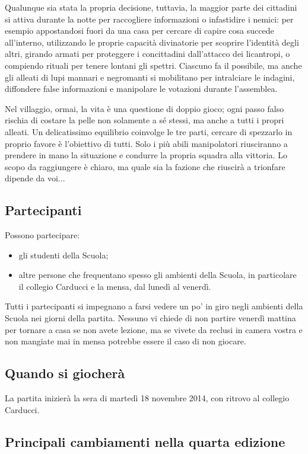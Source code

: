 \documentclass[a4paper,10pt]{article}
\begin{document}
Qualunque sia stata la propria decisione, tuttavia, la maggior parte dei
cittadini si attiva durante la notte per raccogliere informazioni o infastidire
i nemici: per esempio appostandosi fuori da una casa per cercare di capire cosa
succede all'interno, utilizzando le proprie capacità divinatorie per scoprire
l'identità degli altri, girando armati per proteggere i concittadini
dall'attacco dei licantropi, o compiendo rituali per tenere lontani gli spettri.
Ciascuno fa il possibile, ma anche gli alleati di lupi mannari e negromanti si
mobilitano per intralciare le indagini, diffondere false informazioni e
manipolare le votazioni durante l'assemblea.

Nel villaggio, ormai, la vita è una questione di doppio gioco; ogni passo falso
rischia di costare la pelle non solamente a sé stessi, ma anche a tutti i propri
alleati. Un delicatissimo equilibrio coinvolge le tre parti, cercare di
spezzarlo in proprio favore è l'obiettivo di tutti. Solo i più abili
manipolatori riusciranno a prendere in mano la situazione e condurre la
propria squadra alla vittoria. Lo scopo da raggiungere è chiaro, ma quale sia la
fazione che riuscirà a trionfare dipende da voi...



\subsection{Partecipanti}
Possono partecipare:
\begin{itemize}
 \item gli studenti della Scuola;
 \item altre persone che frequentano spesso gli ambienti della Scuola, in
particolare il collegio Carducci e la mensa, dal lunedì al venerdì.
\end{itemize}
Tutti i partecipanti si impegnano a farsi vedere un po' in giro negli ambienti
della Scuola nei giorni della partita. Nessuno vi chiede di non partire venerdì
mattina per tornare a casa se non avete lezione, ma se vivete da reclusi in
camera vostra e non mangiate mai in mensa potrebbe essere il caso di non
giocare.


\subsection{Quando si giocherà}

La partita inizierà la sera di martedì 18 novembre 2014, con ritrovo al collegio Carducci.


\subsection{Principali cambiamenti nella quarta edizione}
\end{document}

